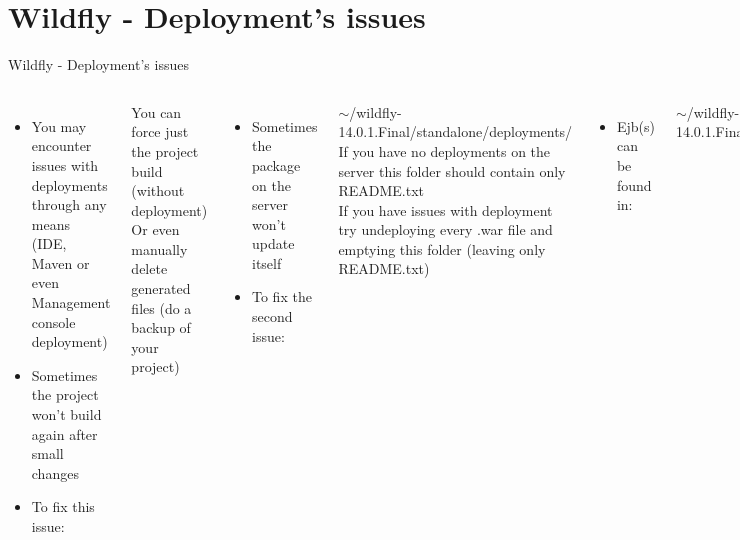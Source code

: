 \documentclass[aspectratio=1610,english]{beamer} %
\begin{document}
  	\section{Wildfly - Deployment's issues}
	\begin{frame}{Wildfly - Deployment's issues}
		\begin{columns}
				
				\begin{itemize}
					\tiny
					\color{black}
					\item You may encounter issues with deployments through any means \\ 
					(IDE, Maven or even Management console deployment)
					\item Sometimes the project won't build again after small changes
					\item To fix this issue:
				\end{itemize}
				\fontsize{4}{5} \selectfont
				 You can force just the project build (without deployment) \\
				 Or even manually delete generated files (do a backup of your project)
				
				\begin{itemize}
					\tiny
					\color{black}
					\item Sometimes the package on the server won't update itself
					\item To fix the second issue:
				\end{itemize}
				\fontsize{4}{5} \selectfont
				$\sim$/wildfly-14.0.1.Final/standalone/deployments/ \\
				If you have no deployments on the server this folder should contain only README.txt \\
				If you have issues with deployment try undeploying every .war file and emptying this folder (leaving only README.txt)
				
				\begin{itemize}
					\tiny
					\color{black}
					\item Ejb(s) can be found in:
				\end{itemize}
				
				\fontsize{4}{5} \selectfont
				$\sim$/wildfly-14.0.1.Final/standalone/data/wsdl \\
		\end{columns}
	\end{frame}
	
\end{document}
